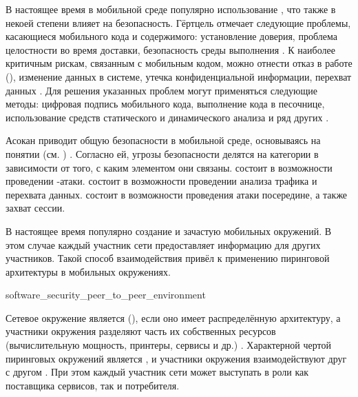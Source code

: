 %
В настоящее время в мобильной среде популярно использование , что также в некоей степени влияет на безопасность. 
%
Гёртцель отмечает следующие проблемы, касающиеся мобильного кода и содержимого: установление доверия, проблема целостности во время доставки, безопасность среды выполнения .
%
К наиболее критичным рискам, связанным с мобильным кодом, можно отнести отказ в работе (), изменение данных в системе, утечка конфиденциальной информации, перехват данных .
%
Для решения указанных проблем могут применяться следующие методы: цифровая подпись мобильного кода, выполнение кода в песочнице, использование средств статического и динамического анализа и ряд других    . 

%
Асокан приводит общую  безопасности в мобильной среде, основываясь на понятии  (см. ) .
%
Согласно ей, угрозы безопасности делятся на категории в зависимости от того, с каким элементом  они связаны. 
%
 состоит в возможности проведении -атаки.
%
 состоит в возможности проведении анализа трафика и перехвата данных.
%
 состоит в возможности проведения атаки посередине, а также захват сессии.

%
В настоящее время популярно создание  и зачастую  мобильных окружений. 
%
В этом случае каждый участник сети предоставляет информацию для других участников. 
%
Такой способ взаимодействия привёл к применению пиринговой архитектуры в мобильных окружениях. 


	{software_security_peer_to_peer_environment}

%
Сетевое окружение является  (), если оно имеет распределённую архитектуру, а участники окружения разделяют часть их собственных ресурсов (вычислительную мощность, принтеры, сервисы и др.) .
%
Характерной чертой пиринговых окружений является , и участники окружения взаимодействуют друг с другом . 
%
При этом каждый участник сети может выступать в роли как поставщика сервисов, так и потребителя. 


